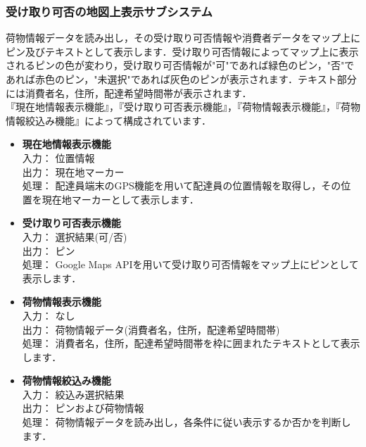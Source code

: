 \documentclass[a4j,titlepage]{jarticle}
\begin{document}

\subsubsection{受け取り可否の地図上表示サブシステム}
荷物情報データを読み出し，その受け取り可否情報や消費者データをマップ上にピン及びテキストとして表示します．受け取り可否情報によってマップ上に表示されるピンの色が変わり，受け取り可否情報が"可"であれば緑色のピン，"否"であれば赤色のピン，"未選択"であれば灰色のピンが表示されます．テキスト部分には消費者名，住所，配達希望時間帯が表示されます． \\
『現在地情報表示機能』，『受け取り可否表示機能』，『荷物情報表示機能』，『荷物情報絞込み機能』によって構成されています．
\begin{itemize}
\item \textbf{現在地情報表示機能} \\
入力： 位置情報 \\
出力： 現在地マーカー \\
処理： 配達員端末のGPS機能を用いて配達員の位置情報を取得し，その位置を現在地マーカーとして表示します．
\item \textbf{受け取り可否表示機能} \\
入力： 選択結果(可/否) \\
出力： ピン \\
処理： Google Maps APIを用いて受け取り可否情報をマップ上にピンとして表示します．
\item \textbf{荷物情報表示機能} \\
入力： なし \\
出力： 荷物情報データ(消費者名，住所，配達希望時間帯) \\
処理： 消費者名，住所，配達希望時間帯を枠に囲まれたテキストとして表示します．
\item \textbf{荷物情報絞込み機能} \\
入力： 絞込み選択結果 \\
出力： ピンおよび荷物情報 \\
処理： 荷物情報データを読み出し，各条件に従い表示するか否かを判断します．
\end{itemize}
\end{document}
